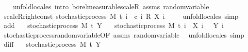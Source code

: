 \begin{isabellebody}
%
\isadelimproof
\ \ %
\endisadelimproof
%
\isatagproof
{}\isamarkupfalse%
\ {\isacharparenleft}{\kern0pt}unfold{\isacharunderscore}{\kern0pt}locales{\isacharparenright}{\kern0pt}\ {\isacharparenleft}{\kern0pt}intro\ borel{\isacharunderscore}{\kern0pt}measurable{\isacharunderscore}{\kern0pt}scaleR\ assms\ random{\isacharunderscore}{\kern0pt}variable{\isacharparenright}{\kern0pt}%
\endisatagproof
{\isafoldproof}%
%
\isadelimproof
\isanewline
%
\endisadelimproof
\isanewline
{}\isamarkupfalse%
\ scaleR{\isacharunderscore}{\kern0pt}right{\isacharunderscore}{\kern0pt}const{\isacharcolon}{\kern0pt}\ {\isachardoublequoteopen}stochastic{\isacharunderscore}{\kern0pt}process\ M\ t\ {\isacharparenleft}{\kern0pt}{\isasymlambda}i\ {\isasymxi}{\isachardot}{\kern0pt}\ c\ i\ {\isacharasterisk}{\kern0pt}\isactrlsub R\ {\isacharparenleft}{\kern0pt}X\ i\ {\isasymxi}{\isacharparenright}{\kern0pt}{\isacharparenright}{\kern0pt}{\isachardoublequoteclose}\isanewline
%
\isadelimproof
\ \ %
\endisadelimproof
%
\isatagproof
{}\isamarkupfalse%
\ {\isacharparenleft}{\kern0pt}unfold{\isacharunderscore}{\kern0pt}locales{\isacharparenright}{\kern0pt}\ simp%
\endisatagproof
{\isafoldproof}%
%
\isadelimproof
\isanewline
%
\endisadelimproof
\isanewline
{}\isamarkupfalse%
\ add{\isacharcolon}{\kern0pt}\isanewline
\ \ \ {\isachardoublequoteopen}stochastic{\isacharunderscore}{\kern0pt}process\ M\ t\ Y{\isachardoublequoteclose}\isanewline
\ \ \ {\isachardoublequoteopen}stochastic{\isacharunderscore}{\kern0pt}process\ M\ t\ {\isacharparenleft}{\kern0pt}{\isasymlambda}i\ {\isasymxi}{\isachardot}{\kern0pt}\ X\ i\ {\isasymxi}\ {\isacharplus}{\kern0pt}\ Y\ i\ {\isasymxi}{\isacharparenright}{\kern0pt}{\isachardoublequoteclose}\isanewline
%
\isadelimproof
\ \ %
\endisadelimproof
%
\isatagproof
{}\isamarkupfalse%
\ stochastic{\isacharunderscore}{\kern0pt}process{\isachardot}{\kern0pt}random{\isacharunderscore}{\kern0pt}variable{\isacharbrackleft}{\kern0pt}OF\ assms{\isacharbrackright}{\kern0pt}\ random{\isacharunderscore}{\kern0pt}variable\ \isamarkupfalse%
\ {\isacharparenleft}{\kern0pt}unfold{\isacharunderscore}{\kern0pt}locales{\isacharparenright}{\kern0pt}\ simp%
\endisatagproof
{\isafoldproof}%
%
\isadelimproof
\isanewline
%
\endisadelimproof
\isanewline
{}\isamarkupfalse%
\ diff{\isacharcolon}{\kern0pt}\isanewline
\ \ \ {\isachardoublequoteopen}stochastic{\isacharunderscore}{\kern0pt}process\ M\ t\ Y{\isachardoublequoteclose}\isanewline

\end{isabellebody}

